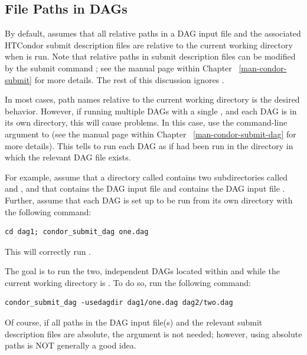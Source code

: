 \subsection{\label{sec:DAGPaths}File Paths in DAGs}

By default,  assumes that all relative paths in a
DAG input file and the associated HTCondor submit description files
are relative to the current
working directory when  is run.  
Note that 
relative paths in submit description files can be modified by the submit command
; see the  manual page within Chapter
~\ref{man-condor-submit} for more details.  The rest of this discussion
ignores .

In most cases, path names relative to the current working directory 
is the desired behavior.
However, if running
multiple DAGs with a single , and each DAG is in its
own directory, this will cause problems.  In this case,
use the  command-line argument to
 (see the  manual page within Chapter
~\ref{man-condor-submit-dag} for more details).
This tells  to run each DAG
as if  had been run in the directory in which
the relevant DAG file exists.

For example, assume that a directory called 
contains two subdirectories called  and
, and that  contains the DAG input file 
and  contains the DAG input file .
Further, assume that each DAG is set up to be run
from its own directory with the following command:
\begin{verbatim}
cd dag1; condor_submit_dag one.dag
\end{verbatim}
This will correctly run .

The goal is to run the two, independent DAGs located within
 and  while the current working directory
is .  To do so, run the following command:
\begin{verbatim}
condor_submit_dag -usedagdir dag1/one.dag dag2/two.dag
\end{verbatim}

Of course, if all paths in the DAG input file(s) and the relevant submit
description files are absolute,
the  argument is not needed;
however, using absolute paths is NOT generally a good idea.

